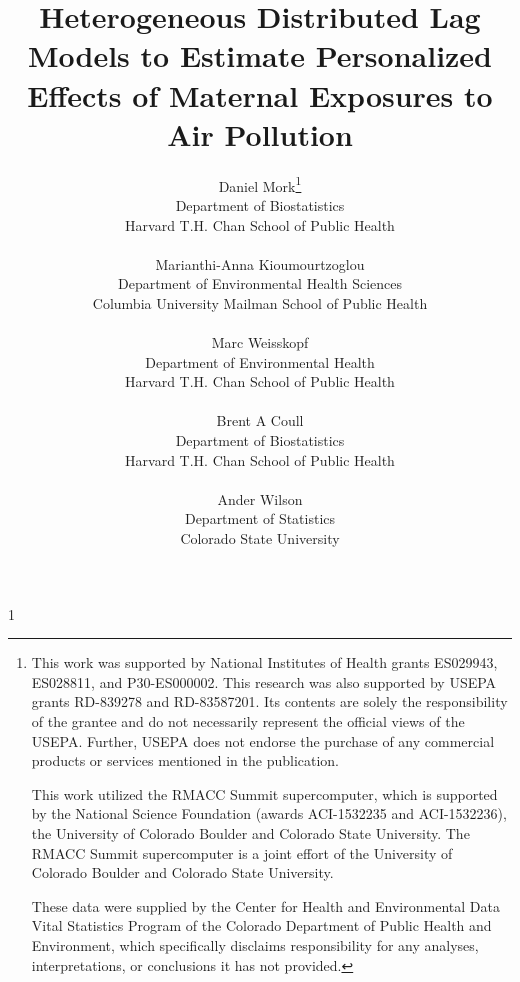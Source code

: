 \documentclass[12pt]{article}
\newcommand{\blind}{1}
\begin{document}
%

\def\spacingset#1{\renewcommand{\baselinestretch}%
{#1}\small\normalsize} \spacingset{1}



\blind
{
  \title{\bf Heterogeneous Distributed Lag Models to Estimate Personalized Effects of Maternal Exposures to Air Pollution}
  \author{Daniel Mork\thanks{This work was supported by National Institutes of Health grants ES029943, ES028811, and P30-ES000002. This research was also supported by USEPA grants RD-839278 and RD-83587201. Its contents are solely the responsibility of the grantee and do not necessarily represent the official views of the USEPA. Further, USEPA does not endorse the purchase of any commercial products or services mentioned in the publication.

This work utilized the RMACC Summit supercomputer, which is supported by the National Science Foundation (awards ACI-1532235 and ACI-1532236), the University of Colorado Boulder and Colorado State University. The RMACC Summit supercomputer is a joint effort of the University of Colorado Boulder and Colorado State University.

These data were supplied by the Center for Health and Environmental Data Vital Statistics Program of the Colorado Department of Public Health and Environment, which specifically disclaims responsibility for any analyses, interpretations, or conclusions it has not provided.}\hspace{.2cm}\\ 
Department of Biostatistics\\ Harvard T.H. Chan School of Public Health\\\\

Marianthi-Anna Kioumourtzoglou\\
Department of Environmental Health Sciences\\
Columbia University Mailman School of Public Health\\\\

Marc Weisskopf\\
Department of Environmental Health\\ 
Harvard T.H. Chan School of Public Health\\\\ 

Brent A Coull\\
Department of Biostatistics\\
Harvard T.H. Chan School of Public Health\\\\ 

Ander Wilson\\ 
Department of Statistics\\ Colorado State University}
  \maketitle
} \fi
\end{document}
